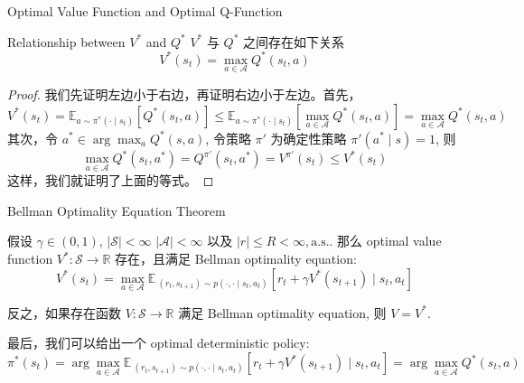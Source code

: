 \documentclass[aspectratio=169]{beamer}
\begin{document}
\begin{frame}{Optimal Value Function and Optimal Q-Function}
    \begin{block}{Relationship between $V^*$ and $Q^*$}
        $V^*$ 与 $Q^*$ 之间存在如下关系
        \begin{equation}
            V^*(s_t) = \max_{a\in\mathcal{A}} Q^*(s_t, a)
        \end{equation}
    \end{block}

    \begin{proof}
        我们先证明左边小于右边，再证明右边小于左边。首先，
        \begin{equation}
            V^*(s_t) =\mathbb{E}_{a\sim \pi^*(\cdot\mid s_t)}[Q^*(s_t,a)]\leq \mathbb{E}_{a\sim \pi^*(\cdot\mid s_t)}[\max_{a\in\mathcal{A}}Q^*(s_t,a)] =  \max_{a\in\mathcal{A}} Q^*(s_t, a)
        \end{equation}
        其次，令 $a^*\in\arg\max_{a}Q^*(s,a)$, 令策略 $\pi'$ 为确定性策略 $\pi'(a^*\mid s)=1$, 则
        \begin{equation}
            \max_{a\in\mathcal{A}} Q^*(s_t,a^*) = Q^{\pi'}(s_t,a^*)=V^{\pi'}(s_t)\leq V^*(s_t)
        \end{equation}
        这样，我们就证明了上面的等式。
    \end{proof}
\end{frame}


\begin{frame}{Bellman Optimality Equation Theorem}
\begin{theorem}
    假设 $\gamma\in(0,1)$, $|\mathcal{S}|<\infty$ $|\mathcal{A}|<\infty$ 以及 $|r|\leq R<\infty, \mathrm{a.s.}$.  
    那么 optimal value function $V^*:\mathcal{S}\to\mathbb{R}$ 存在，且满足 Bellman optimality equation:
    \begin{equation}
        V^*(s_t) = \max_{a\in\mathcal{A}}\mathbb{E}_{\ (r_t,s_{t+1})\sim p(\cdot,\cdot\mid s_t,a_t)}\left[r_t+\gamma V^*(s_{t+1})\mid s_t, a_t\right]
    \end{equation}

    反之，如果存在函数 $V:\mathcal{S}\to\mathbb{R}$ 满足 Bellman optimality equation, 则 $V=V^*$.

    最后，我们可以给出一个 optimal deterministic policy:
    \begin{equation}
        \pi^*(s_t) = \arg\max_{a\in\mathcal{A}}\mathbb{E}_{\ (r_t,s_{t+1})\sim p(\cdot,\cdot\mid s_t,a_t)}\left[r_t+\gamma V^*(s_{t+1})\mid s_t, a_t\right]=\arg\max_{a\in\mathcal{A}} Q^*(s_t,a)
    \end{equation}
\end{theorem}
\end{frame}
\end{document}
